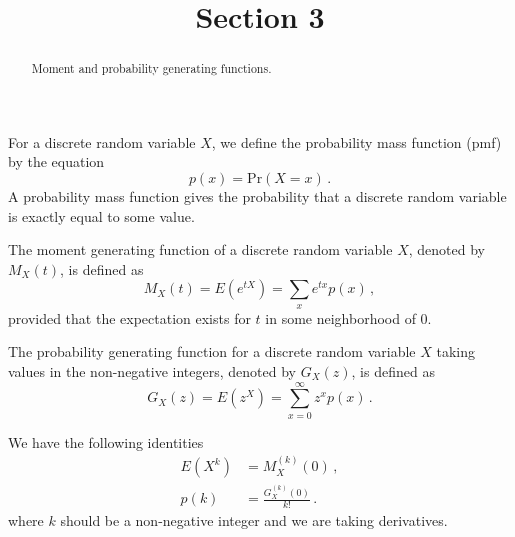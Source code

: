 \documentclass{ximera}
\title{Section 3}
\begin{document}
\begin{abstract}
Moment and probability generating functions.
\end{abstract}
\maketitle

For a discrete random variable $X$, we define the probability mass function (pmf) by the equation
\[
p(x) = \text{Pr}(X=x)\,.
\]
A probability mass function gives the probability that a discrete random variable is exactly equal to some value. \vspace{.25cm}

The moment generating function of a discrete random variable $X$, denoted by $M_{X}(t)$, is defined as
\[  
M_{X}(t) = E( e^{tX} ) = \sum_{x} e^{tx}p(x) \,,
\]
provided that the expectation exists for $t$ in some neighborhood of $0$. \vspace{.25cm}

 The probability generating function for a discrete random variable $X$ taking values in the non-negative integers, denoted by $G_{X}(z)$, is defined as
 \[
 G_{X}(z) = E(z^{X}) = \sum_{x=0}^{\infty} z^{x}p(x) \,.
 \]
 
We have the following identities
\begin{align*}
E(X^{k}) &= M^{(k)}_{X}(0) \,,  \\
 p(k) &= \frac{G^{(k)}_{X}(0)}{k!} \,.
\end{align*}
where $k$ should be a non-negative integer and we are taking derivatives. 
\end{document}
